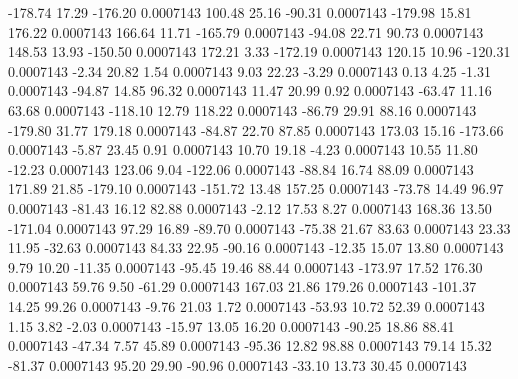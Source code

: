      -178.74       17.29     -176.20     0.0007143
      100.48       25.16      -90.31     0.0007143
     -179.98       15.81      176.22     0.0007143
      166.64       11.71     -165.79     0.0007143
      -94.08       22.71       90.73     0.0007143
      148.53       13.93     -150.50     0.0007143
      172.21        3.33     -172.19     0.0007143
      120.15       10.96     -120.31     0.0007143
       -2.34       20.82        1.54     0.0007143
        9.03       22.23       -3.29     0.0007143
        0.13        4.25       -1.31     0.0007143
      -94.87       14.85       96.32     0.0007143
       11.47       20.99        0.92     0.0007143
      -63.47       11.16       63.68     0.0007143
     -118.10       12.79      118.22     0.0007143
      -86.79       29.91       88.16     0.0007143
     -179.80       31.77      179.18     0.0007143
      -84.87       22.70       87.85     0.0007143
      173.03       15.16     -173.66     0.0007143
       -5.87       23.45        0.91     0.0007143
       10.70       19.18       -4.23     0.0007143
       10.55       11.80      -12.23     0.0007143
      123.06        9.04     -122.06     0.0007143
      -88.84       16.74       88.09     0.0007143
      171.89       21.85     -179.10     0.0007143
     -151.72       13.48      157.25     0.0007143
      -73.78       14.49       96.97     0.0007143
      -81.43       16.12       82.88     0.0007143
       -2.12       17.53        8.27     0.0007143
      168.36       13.50     -171.04     0.0007143
       97.29       16.89      -89.70     0.0007143
      -75.38       21.67       83.63     0.0007143
       23.33       11.95      -32.63     0.0007143
       84.33       22.95      -90.16     0.0007143
      -12.35       15.07       13.80     0.0007143
        9.79       10.20      -11.35     0.0007143
      -95.45       19.46       88.44     0.0007143
     -173.97       17.52      176.30     0.0007143
       59.76        9.50      -61.29     0.0007143
      167.03       21.86      179.26     0.0007143
     -101.37       14.25       99.26     0.0007143
       -9.76       21.03        1.72     0.0007143
      -53.93       10.72       52.39     0.0007143
        1.15        3.82       -2.03     0.0007143
      -15.97       13.05       16.20     0.0007143
      -90.25       18.86       88.41     0.0007143
      -47.34        7.57       45.89     0.0007143
      -95.36       12.82       98.88     0.0007143
       79.14       15.32      -81.37     0.0007143
       95.20       29.90      -90.96     0.0007143
      -33.10       13.73       30.45     0.0007143
